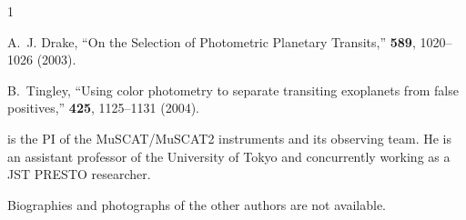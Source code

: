 \documentclass[a4paper,12pt]{spieman}  %
\begin{document}
\begin{spacing}{1}
\begin{thebibliography}{}
A.~J. {Drake}, ``{On the Selection of Photometric Planetary Transits},'' {\em
  \apj} {\bf 589}, 1020--1026  (2003).

B.~{Tingley}, ``{Using color photometry to separate transiting exoplanets from
  false positives},'' {\em \aap} {\bf 425}, 1125--1131  (2004).  
  
\end{thebibliography}


\vspace{2ex} is the PI of the MuSCAT/MuSCAT2 instruments and its observing team.
He is an assistant professor of the University of Tokyo and concurrently working as a JST PRESTO researcher.


\vspace{1ex}
\noindent Biographies and photographs of the other authors are not available.


\end{spacing}
\end{document}
